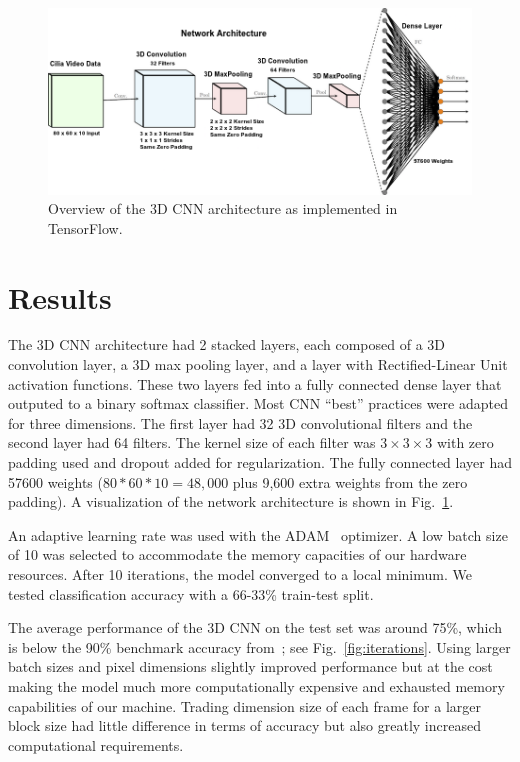 \begin{figure}
\includegraphics[scale=1.2]{arch}
\caption{Overview of the 3D CNN architecture as implemented in TensorFlow.}
\label{fig:cnn}
\end{figure}

\section{Results}

The 3D CNN architecture had 2 stacked layers, each composed of a 3D convolution layer, a 3D max pooling layer, and a layer with Rectified-Linear Unit \cite{nair2010rectified} activation functions. These two layers fed into a fully connected dense layer that outputed to a binary softmax classifier. Most CNN ``best'' practices \cite{goodfellow_bengio_courville_2016} were adapted for three dimensions. The first layer had 32 3D convolutional filters and the second layer had 64 filters. The kernel size of each filter was $3 \times 3 \times 3$ with zero padding used and dropout \cite{srivastava2014dropout} added for regularization. The fully connected layer had 57600 weights ($80 * 60 * 10 = 48,000$ plus 9,600 extra weights from the zero padding). A visualization of the network architecture is shown in Fig.~\ref{fig:cnn}.

An adaptive learning rate was used with the ADAM~\cite{kingma2014adam} optimizer. A low batch size of 10 was selected to accommodate the memory capacities of our hardware resources. After 10 iterations, the model converged to a local minimum. We tested classification accuracy with a 66-33\% train-test split. 

The average performance of the 3D CNN on the test set was around 75\%, which is below the 90\% benchmark accuracy from~\cite{quinn2015automated}; see Fig.~\ref{fig:iterations}. Using larger batch sizes and pixel dimensions slightly improved performance but at the cost making the model much more computationally expensive and exhausted memory capabilities of our machine. Trading dimension size of each frame for a larger block size had little difference in terms of accuracy but also greatly increased computational requirements.  

